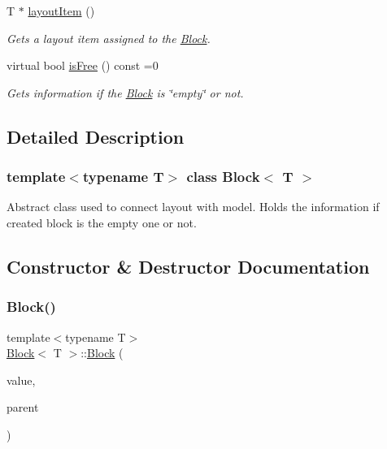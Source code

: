 \begin{DoxyCompactItemize}
T $\ast$ \mbox{\hyperlink{class_block_adebc177a35bfd2ecaebd8fc23a6ceafb}{layout\+Item}} ()
\begin{DoxyCompactList}\small\item\em Gets a layout item assigned to the \mbox{\hyperlink{class_block}{Block}}. \end{DoxyCompactList}\item 
virtual bool \mbox{\hyperlink{class_block_a795e0536746b840286cb1e74487311a9}{is\+Free}} () const =0
\begin{DoxyCompactList}\small\item\em Gets information if the \mbox{\hyperlink{class_block}{Block}} is \char`\"{}empty\char`\"{} or not. \end{DoxyCompactList}\end{DoxyCompactItemize}


\subsection{Detailed Description}
\subsubsection*{template$<$typename T$>$\newline
class Block$<$ T $>$}

Abstract class used to connect layout with model. Holds the information if created block is the empty one or not. 



\subsection{Constructor \& Destructor Documentation}
\mbox{\label{class_block_aa19ca9a93a3cb69f9583c1f5edfd5d26}} 
\subsubsection{\texorpdfstring{Block()}{Block()}\hspace{0.1cm}{\footnotesize\ttfamily [1/2]}}
{\footnotesize\ttfamily template$<$typename T$>$ \\
\mbox{\hyperlink{class_block}{Block}}$<$ T $>$\+::\mbox{\hyperlink{class_block}{Block}} (\begin{DoxyParamCaption}\item[{const size\+\_\+t}]{value,  }\item[{Q\+Graphics\+Item $\ast$}]{parent }\end{DoxyParamCaption})\hspace{0.3cm}{\ttfamily [inline]}}



